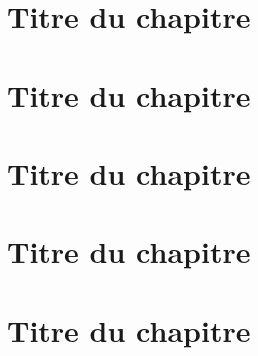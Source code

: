 



	

	\frontmatter %

	

	\sommaires %

	

	\mainmatter %

	\chapter{Titre du chapitre}

		
	
	\chapter{Titre du chapitre}

			
	
	\chapter{Titre du chapitre}

			

	\chapter{Titre du chapitre}

			

	\chapter{Titre du chapitre}

			

	


	\backmatter %

	


